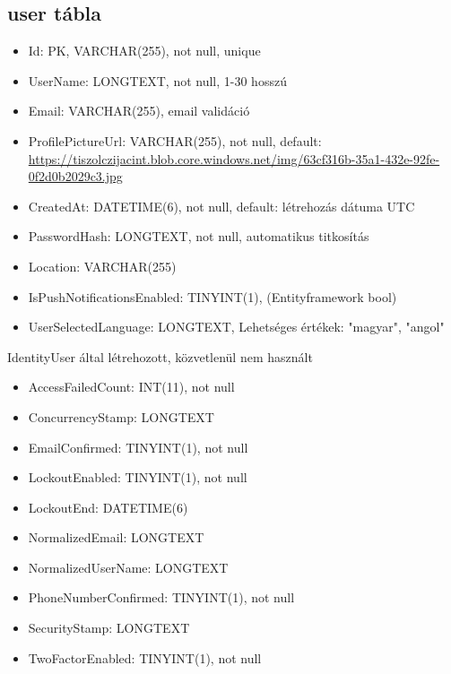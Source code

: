\documentclass[11pt]{article}
\begin{document}
\subsection{user tábla}
\label{sec:org85f99be}
\begin{itemize}
\item Id: PK, VARCHAR(255), not null, unique
\item UserName: LONGTEXT, not null, 1-30 hosszú
\item Email: VARCHAR(255), email validáció
\item ProfilePictureUrl: VARCHAR(255), not null, default: \url{https://tiszolczijacint.blob.core.windows.net/img/63cf316b-35a1-432e-92fe-0f2d0b2029c3.jpg}
\item CreatedAt: DATETIME(6), not null, default: létrehozás dátuma UTC
\item PasswordHash: LONGTEXT, not null, automatikus titkosítás
\item Location: VARCHAR(255)
\item IsPushNotificationsEnabled: TINYINT(1), (Entityframework bool)
\item UserSelectedLanguage: LONGTEXT, Lehetséges értékek: "magyar", "angol"
\end{itemize}

IdentityUser által létrehozott, közvetlenül nem használt
\begin{itemize}
\item AccessFailedCount: INT(11), not null
\item ConcurrencyStamp: LONGTEXT
\item EmailConfirmed: TINYINT(1), not null
\item LockoutEnabled: TINYINT(1), not null
\item LockoutEnd: DATETIME(6)
\item NormalizedEmail: LONGTEXT
\item NormalizedUserName: LONGTEXT
\item PhoneNumberConfirmed: TINYINT(1), not null
\item SecurityStamp: LONGTEXT
\item TwoFactorEnabled: TINYINT(1), not null
\end{itemize}
\end{document}
